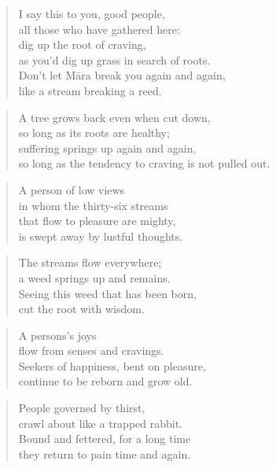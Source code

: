 \documentclass[12pt,openany]{book}%
\begin{document}
\begin{verse}%
I say this to you, good people, \\
all those who have gathered here: \\
dig up the root of craving, \\
as you’d dig up grass in search of roots. \\
Don’t let \textsanskrit{Māra} break you again and again, \\
like a stream breaking a reed. 

%
\end{verse}

\begin{verse}%
A tree grows back even when cut down, \\
so long as its roots are healthy; \\
suffering springs up again and again, \\
so long as the tendency to craving is not pulled out. 

%
\end{verse}

\begin{verse}%
A person of low views \\
in whom the thirty-six streams \\
that flow to pleasure are mighty, \\
is swept away by lustful thoughts. 

%
\end{verse}

\begin{verse}%
The streams flow everywhere; \\
a weed springs up and remains. \\
Seeing this weed that has been born, \\
cut the root with wisdom. 

%
\end{verse}

\begin{verse}%
A persons’s joys \\
flow from senses and cravings. \\
Seekers of happiness, bent on pleasure, \\
continue to be reborn and grow old. 

%
\end{verse}

\begin{verse}%
People governed by thirst, \\
crawl about like a trapped rabbit. \\
Bound and fettered, for a long time \\
they return to pain time and again. 

%
\end{verse}
\end{document}
